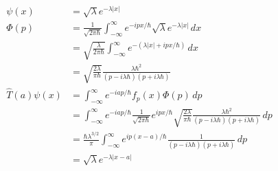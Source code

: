 \documentclass{article}
\begin{document}
\setcounter{subsection}{30}
\subsection{}

\begin{align*}
  \psi(x)            & = \sqrt{\lambda} e^{-\lambda |x|}                                                                                                                                                                      \\
  \Phi(p)            & = \frac{1}{\sqrt{2 \pi \hbar}} \int_{-\infty}^\infty e^{-i p x / \hbar} \sqrt{\lambda} e^{-\lambda |x|} \,d x                                                                                          \\
                     & = \sqrt{\frac{\lambda}{2 \pi \hbar}} \int_{-\infty}^\infty e^{-(\lambda |x| + i p x / \hbar)} \,d x                                                                                                    \\
                     & = \sqrt{\frac{2 \lambda}{\pi \hbar}} \frac{\lambda \hbar^2}{(p - i \lambda \hbar) (p + i \lambda \hbar)}                                                                                               \\
  \hat{T}(a) \psi(x) & = \int_{-\infty}^\infty e^{-i a p / \hbar} f_p(x) \Phi(p) \,d p                                                                                                                                        \\
                     & = \int_{-\infty}^\infty e^{-i a p / \hbar} \frac{1}{\sqrt{2 \pi \hbar}} e^{i p x / \hbar} \sqrt{\frac{2 \lambda}{\pi \hbar}} \frac{\lambda \hbar^2}{(p - i \lambda \hbar) (p + i \lambda \hbar)} \,d p \\
                     & = \frac{\hbar \lambda^{3 / 2}}{\pi} \int_{-\infty}^\infty e^{i p (x - a) / \hbar} \frac{1}{(p - i \lambda \hbar) (p + i \lambda \hbar)} \,d p                                                          \\
                     & = \sqrt{\lambda} e^{-\lambda |x - a|}
\end{align*}
\end{document}
